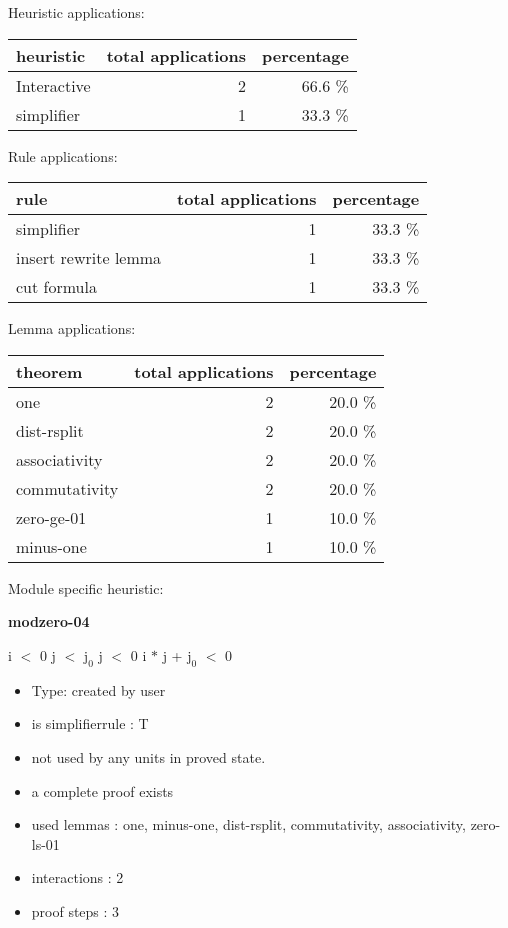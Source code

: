 \documentclass[a4paper]{article}
\begin{document}
\medskip


Heuristic applications:

\begin{supertabular}{l|r|r}
heuristic	& total applications & percentage \\ \hline
Interactive & 2 & 66.6 \% \\
simplifier & 1 & 33.3 \% \\

\end{supertabular}

Rule applications:

\begin{supertabular}{l|r|r}
rule	        & total applications & percentage \\ \hline
simplifier & 1 & 33.3 \% \\
insert rewrite lemma & 1 & 33.3 \% \\
cut formula & 1 & 33.3 \% \\

\end{supertabular}

Lemma applications:

\begin{supertabular}{l|r|r}
theorem	        & total applications & percentage \\ \hline
one & 2 & 20.0 \% \\
dist-rsplit & 2 & 20.0 \% \\
associativity & 2 & 20.0 \% \\
commutativity & 2 & 20.0 \% \\
zero-ge-01 & 1 & 10.0 \% \\
minus-one & 1 & 10.0 \% \\

\end{supertabular}

Module specific heuristic:

\pagebreak

{\LARGE\bf modzero-04}\label{lemma-modzero-04}

\medskip

 \Fol i $<$ 0 \And j $<$ $\mbox{j}_{0}$ \And j $<$ 0 \Imp \Not i $*$ j + $\mbox{j}_{0}$ $<$ 0

\begin{itemize}

\item Type: created by user

\item is simplifierrule : T
\item not used by any units in proved state.
\item       a complete proof exists
\item       used lemmas  : one, minus-one, dist-rsplit, commutativity, associativity, zero-ls-01
\item       interactions : 2
\item       proof steps  : 3
\end{itemize}
\end{document}
